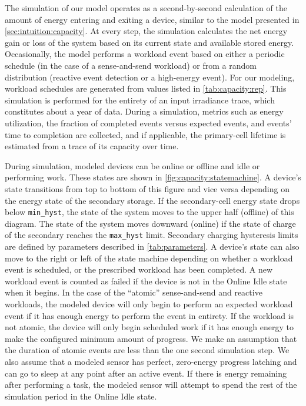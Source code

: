 The simulation of our model operates as a second-by-second calculation of the
amount of energy entering and exiting a device, similar to the model presented in \cref{sec:intuition:capacity}.
At every step, the simulation calculates the net energy gain or loss of the
system based on its current state and available stored energy.  Occasionally,
the model performs a workload event based on either a periodic schedule (in the
case of a sense-and-send workload) or from a random distribution (reactive
event detection or a high-energy event). For our modeling, workload schedules
are generated from values listed in \cref{tab:capacity:rep}.
This simulation is performed for the entirety of an
input irradiance trace, which constitutes about a year of data. During
a simulation, metrics such as energy utilization, the fraction of completed
events versus expected events, and events' time to completion are collected,
and if applicable, the primary-cell lifetime is estimated from a trace of its capacity over time.


During simulation, modeled devices can be online or offline and idle or performing
work. These states are shown in \cref{fig:capacity:statemachine}.  A device's state
transitions from top to bottom of this figure and vice versa depending on the
energy state of the secondary storage.
If the secondary-cell energy state drops below \texttt{min\_hyst},
the state of the system moves to the upper
half (\textsf{offline}) of this diagram. The state of the system moves downward (\textsf{online})
if the state of charge of the secondary reaches the \texttt{max\_hyst}
limit. 
Secondary charging hysteresis limits are defined by parameters described in \cref{tab:parameters}.
A device's state can also move
to the right or left of the state machine depending on whether a workload event
is scheduled, or the prescribed workload has been completed. A new
workload event is counted as failed if the device is not in the \textsf{Online
Idle} state when it begins.
In the case of the ``atomic''
sense-and-send and reactive workloads, the modeled device will only begin
to perform an expected workload event if it has
enough energy to perform the event in entirety. If the workload is not atomic,
the device will only begin scheduled work if it has enough energy to make the
configured minimum amount of progress. We
make an assumption that the duration of atomic events are less than the one
second simulation step.
We also assume that a modeled sensor has perfect, zero-energy progress
latching and can go to sleep at any point after an active event. 
If there is energy remaining after performing a task, the modeled sensor will
attempt to spend the rest of the simulation period in the \textsf{Online Idle} state.

